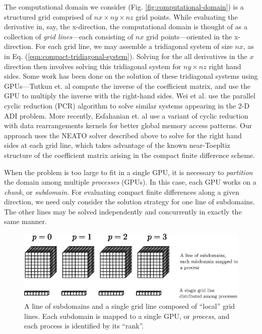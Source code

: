 \documentclass{elsarticle}
\begin{document}
The computational domain we consider
(Fig. \ref{fig:computational-domain})
is a structured grid comprised of
$nx \times ny \times nz$ grid points.
While evaluating the derivative in, say, the x-direction,
the computational domain is thought of as
a collection of \emph{grid lines}---each consisting of
$nx$ grid points---oriented in the x-direction.
For each grid line,
we may assemble a tridiagonal system of size $nx$, as in
Eq. (\ref{eqn:compact-tridiagonal-system}).
Solving for the all derivatives in the $x$ direction then involves
solving this tridiagonal system for $ny \times nz$ right hand sides.
Some work has been done on the solution of these
tridiagonal systems using GPUs---Tutkun et. al
\cite{tutkun2012gpu} compute the inverse of the coefficient matrix,
and use the GPU to multiply the inverse with the right-hand sides.
Wei et al. \cite{wei2013parallelizing}
use the parallel cyclic reduction (PCR) algorithm
to solve similar systems appearing in
the 2-D ADI problem.
More recently, Esfahanian et. al \cite{esfahanian2014efficient}
use a variant of cyclic reduction with
data rearrangements kernels for better global memory access patterns.
Our approach uses the NEATO solver described above
to solve for the right hand sides at each grid line,
which takes advantage of the known near-Toepltiz structure
of the coefficient matrix arising
in the compact finite difference scheme.

When the problem is too large to fit in a single GPU,
it is necessary to \emph{partition} the domain
among multiple \emph{processes} (GPUs).
In this case, each GPU works on a \emph{chunk}, or \emph{subdomain}.
For evaluating compact finite differences along a given direction,
we need only consider the solution strategy for
one line of subdomains.
The other lines may be solved independently and concurrently
in exactly the same manner.

\begin{figure}
\begin{center}
\includegraphics[width=350pt]{img/subdomains-grid-lines.eps}
\caption{A line of subdomains and a single grid line composed of ``local'' grid lines.
    Each subdomain is mapped to a single GPU, or \emph{process},
    and each process is identified by its ``rank''.}
\label{fig:subdomains-grid-lines}
\end{center}
\end{figure}
\end{document}
